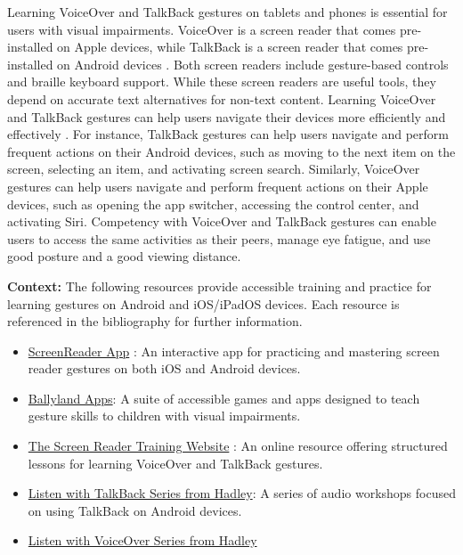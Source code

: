 Learning VoiceOver and TalkBack gestures on tablets and phones is essential for users with visual impairments. VoiceOver is a screen reader that comes pre-installed on Apple devices, while TalkBack is a screen reader that comes pre-installed on Android devices \cite{BOIADevices,BOIATalkBack}. Both screen readers include gesture-based controls and braille keyboard support. While these screen readers are useful tools, they depend on accurate text alternatives for non-text content. Learning VoiceOver and TalkBack gestures can help users navigate their devices more efficiently and effectively \cite{AppleVoiceOver}. For instance, TalkBack gestures can help users navigate and perform frequent actions on their Android devices, such as moving to the next item on the screen, selecting an item, and activating screen search. \cite{GoogleTalkBack} Similarly, VoiceOver gestures can help users navigate and perform frequent actions on their Apple devices, such as opening the app switcher, accessing the control center, and activating Siri. Competency with VoiceOver and TalkBack gestures can enable users to access the same activities as their peers, manage eye fatigue, and use good posture and a good viewing distance.

\noindent
\textbf{Context:} The following resources provide accessible training and practice for learning gestures on Android and iOS/iPadOS devices. Each resource is referenced in the bibliography for further information.

\begin{itemize}
  \item \href{https://screenreader.app/}{ScreenReader App} \cite{ScreenReaderApp}: An interactive app for practicing and mastering screen reader gestures on both iOS and Android devices.
  \item \href{https://www.sonokids.org/ballyland-early-learning/ballyland-game-apps/}{Ballyland Apps}: A suite of accessible games and apps designed to teach gesture skills to children with visual impairments.
  \item \href{https://srt.csb-cde.ca.gov/}{The Screen Reader Training Website} \cite{SRTVoiceOver}: An online resource offering structured lessons for learning VoiceOver and TalkBack gestures.
  \item \href{https://hadley.edu/workshops/listen-with-talkback-series}{Listen with TalkBack Series from Hadley}: A series of audio workshops focused on using TalkBack on Android devices.
  \item \href{https://hadley.edu/workshops/listen-with-voiceover-series}{Listen with VoiceOver Series from Hadley}
 \end{itemize}

